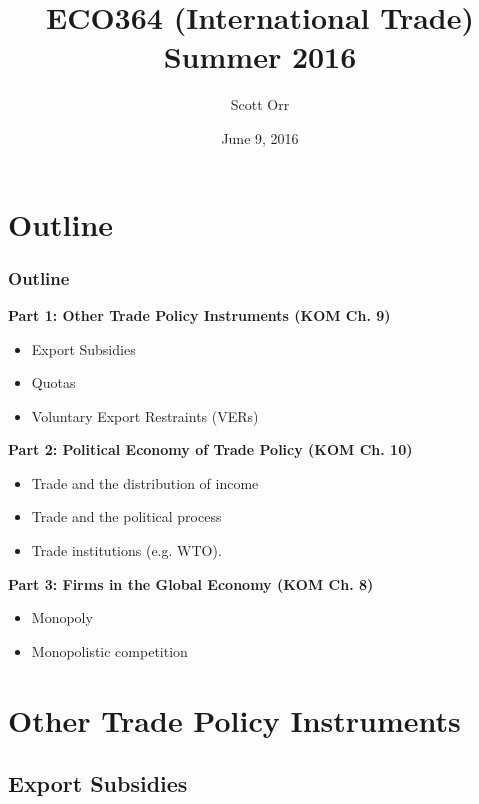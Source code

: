 \documentclass{beamer}
\title{ECO364 (International Trade) Summer 2016}
\date{June 9, 2016}
\author[Scott Orr]{Scott Orr}
\institute{University of Toronto}
\begin{document}
	
	\begin{frame}
		\titlepage
	\end{frame}
	
\section{Outline}
	
	\begin{frame}
		\frametitle{Outline}
		\begin{center}
			\textbf{Part 1: Other Trade Policy Instruments (KOM Ch. 9)}
		\end{center}
			\begin{itemize}
				\item Export Subsidies
				\item Quotas
				\item Voluntary Export Restraints (VERs)
			\end{itemize}
		\begin{center}
			\textbf{Part 2: Political Economy of Trade Policy (KOM Ch. 10)}
		\end{center}
				\begin{itemize}
					\item Trade and the distribution of income
					\item Trade and the political process
					\item Trade institutions (e.g. WTO).
				\end{itemize}
		\begin{center}
			\textbf{Part 3: Firms in the Global Economy (KOM Ch. 8)}
						\begin{itemize}
							\item Monopoly
							\item Monopolistic competition
						\end{itemize}
		\end{center}
		
		
	\end{frame}
	

\section{Other Trade Policy Instruments}

\subsection{Export Subsidies}
\end{document}
